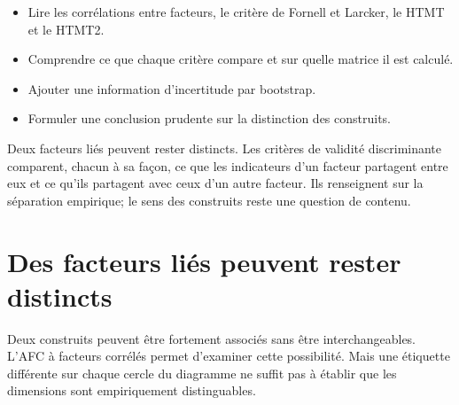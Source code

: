\documentclass[
  french,
  11pt,
  a4paper,
  DIV=11,
  numbers=noendperiod]{scrreprt}
\providecommand{\tightlist}{%
  \setlength{\itemsep}{0pt}\setlength{\parskip}{0pt}}
\begin{document}
\begin{tcolorbox}[enhanced jigsaw, arc=.35mm, bottomrule=.15mm, bottomtitle=1mm, breakable, colback=white, colbacktitle=quarto-callout-note-color!10!white, colframe=quarto-callout-note-color-frame, coltitle=black, left=2mm, leftrule=.75mm, opacityback=0, opacitybacktitle=0.6, rightrule=.15mm, title={Objectifs du chapitre}, titlerule=0mm, toprule=.15mm, toptitle=1mm]

\begin{itemize}
\tightlist
\item
  Lire les corrélations entre facteurs, le critère de Fornell et
  Larcker, le HTMT et le HTMT2.
\item
  Comprendre ce que chaque critère compare et sur quelle matrice il est
  calculé.
\item
  Ajouter une information d'incertitude par bootstrap.
\item
  Formuler une conclusion prudente sur la distinction des construits.
\end{itemize}

\end{tcolorbox}

\begin{tcolorbox}[enhanced jigsaw, arc=.35mm, bottomrule=.15mm, bottomtitle=1mm, breakable, colback=white, colbacktitle=quarto-callout-tip-color!10!white, colframe=quarto-callout-tip-color-frame, coltitle=black, left=2mm, leftrule=.75mm, opacityback=0, opacitybacktitle=0.6, rightrule=.15mm, title={Idée centrale}, titlerule=0mm, toprule=.15mm, toptitle=1mm]

Deux facteurs liés peuvent rester distincts. Les critères de validité
discriminante comparent, chacun à sa façon, ce que les indicateurs d'un
facteur partagent entre eux et ce qu'ils partagent avec ceux d'un autre
facteur. Ils renseignent sur la séparation empirique; le sens des
construits reste une question de contenu.

\end{tcolorbox}

\section{Des facteurs liés peuvent rester
distincts}\label{des-facteurs-liuxe9s-peuvent-rester-distincts}

Deux construits peuvent être fortement associés sans être
interchangeables. L'AFC à facteurs corrélés permet d'examiner cette
possibilité. Mais une étiquette différente sur chaque cercle du
diagramme ne suffit pas à établir que les dimensions sont empiriquement
distinguables.
\end{document}
